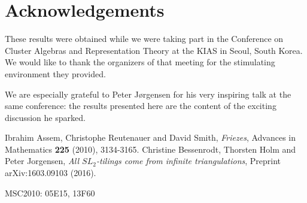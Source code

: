 \documentclass[11pt,reqno]{amsart}
\begin{document}
\section*{Acknowledgements}
  These results were obtained while we were taking part in the Conference on Cluster Algebras and Representation Theory at the KIAS in Seoul, South Korea. 
  We would like to thank the organizers of that meeting for the stimulating environment they provided.
  
  We are especially grateful to Peter J\o rgensen for his very inspiring talk at the same conference: the results presented here are the content of the exciting discussion he sparked.

\begin{thebibliography}{99}
   Ibrahim Assem, Christophe Reutenauer and David Smith, \emph{Friezes}, Advances in Mathematics {\bf 225} (2010), 3134-3165.
   Christine Bessenrodt, Thorsten Holm and Peter Jorgensen, \emph{All $SL_2$-tilings come from infinite triangulations}, Preprint arXiv:1603.09103 (2016).
\end{thebibliography}

\medskip

\noindent MSC2010: 05E15, 13F60
\end{document}
